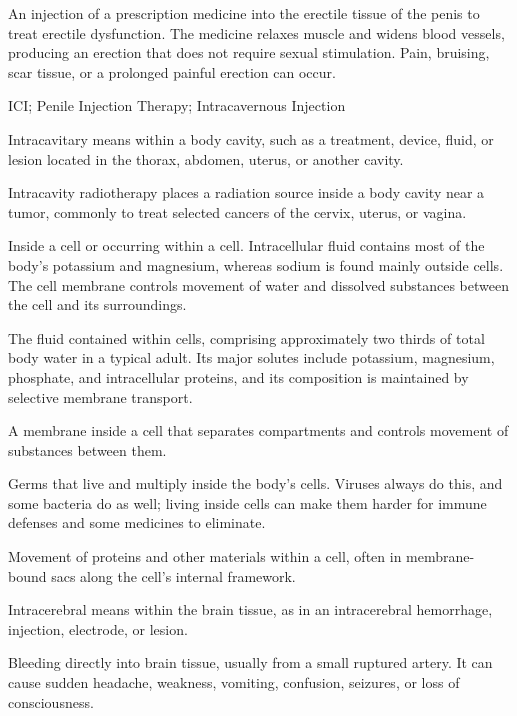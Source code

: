 An injection of a prescription medicine into the erectile tissue of the penis to treat erectile dysfunction. The medicine relaxes muscle and widens blood vessels, producing an erection that does not require sexual stimulation. Pain, bruising, scar tissue, or a prolonged painful erection can occur.

\synonyms
ICI; Penile Injection Therapy; Intracavernous Injection

 Intracavitary means within a body cavity, such as a treatment, device, fluid, or lesion located in the thorax, abdomen, uterus, or another cavity.

 Intracavity radiotherapy places a radiation source inside a body cavity near a tumor, commonly to treat selected cancers of the cervix, uterus, or vagina.

 Inside a cell or occurring within a cell. Intracellular fluid contains most of the body’s potassium and magnesium, whereas sodium is found mainly outside cells. The cell membrane controls movement of water and dissolved substances between the cell and its surroundings.

 The fluid contained within cells, comprising approximately two thirds of total body
water in a typical adult. Its major solutes include potassium, magnesium, phosphate, and
intracellular proteins, and its composition is maintained by selective membrane
transport.

 A membrane inside a cell that separates compartments and controls movement of substances between them.

 Germs that live and multiply inside the body’s cells. Viruses always do this, and some bacteria do as well; living inside cells can make them harder for immune defenses and some medicines to eliminate.

 Movement of proteins and other materials within a cell, often in membrane-bound sacs along the cell's internal framework.

 Intracerebral means within the brain tissue, as in an intracerebral hemorrhage, injection, electrode, or lesion.

 Bleeding directly into brain tissue, usually from a small ruptured artery. It can cause sudden headache, weakness, vomiting, confusion, seizures, or loss of consciousness.

